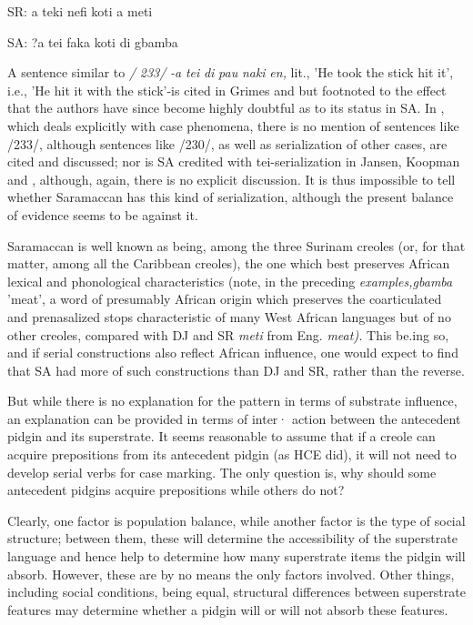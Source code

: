 \ea\label{ex:2:232}
 SR: a teki nefi koti a meti
\z

\ea\label{ex:2:233}
 SA: ?a tei faka koti di gbamba
\z

A sentence similar to \textit{/} \textit{233/} \textit{{}-}\textit{a} \textit{tei} \textit{di} \textit{pau} \textit{naki} \textit{en,} lit., 'He took the stick hit it', i.e., 'He hit it with the stick'{}-is cited in Grimes and \citet{Glock1970} but footnoted to the effect that the authors have since become highly doubtful as to its status in SA. In \citet{Glock1972}, which deals explicitly with case phenomena, there is no mention of sentences like
/233/, although sentences like /230/, as well as serialization of other cases, are cited and discussed; nor is SA credited with tei-serialization in Jansen, Koopman and \citet{Muysken1978}, although, again, there is no explicit discussion. It is thus impossible to tell whether Saramaccan has this kind of serialization, although the present balance of evidence seems to be against it.

Saramaccan is well known as being, among the three Surinam creoles (or, for that matter, among all the Caribbean creoles), the one which best preserves African lexical and phonological characteristics
(note, in the preceding \textit{examples,gbamba} 'meat', a word of presumably African origin which preserves the coarticulated and prenasalized stops characteristic of many West African languages but of no other creoles, compared with DJ and SR \textit{meti} from Eng. \textit{meat).} This be.ing so, and if serial constructions also reflect African influence, one would expect to find that SA had more of such constructions than DJ and SR, rather than the reverse.

But while there is no explanation for the pattern in terms of substrate influence, an explanation can be provided in terms of inter· action between the antecedent pidgin and its superstrate. It seems reasonable to assume that if a creole can acquire prepositions from its antecedent pidgin (as HCE did), it will not need to develop serial verbs for case marking. The only question is, why should some antecedent pidgins acquire prepositions while others do not?

Clearly, one factor is population balance, while another factor is the type of social structure; between them, these will determine the accessibility of the superstrate language and hence help to deter\-mine how many superstrate items the pidgin will absorb. However, these are by no means the only factors involved. Other things, including social conditions, being equal, structural differences between super\-strate features may determine whether a pidgin will or will not absorb these features.

